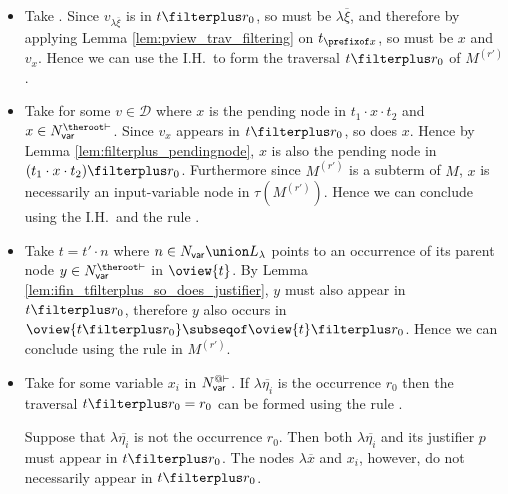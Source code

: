 \begin{itemize}
    \item {} Take .
        Since $v_{\lambda \overline{\xi}}$ is in $t
        \filterplus r_0$, so must be $\lambda \overline{\xi}$, and
        therefore by applying Lemma \ref{lem:pview_trav_filtering}
        on $t_{\prefixof x}$, so must be $x$ and $v_x$. Hence we can
        use the I.H.\ to form the traversal $t
        \filterplus r_0$ of $M^{(r')}$.


   \item {} Take  for some
    $v \in \mathcal{D}$ where $x$ is the pending node in $t_1 \cdot x \cdot t_2$ and $x \in N_{\sf var}^{\theroot\vdash}$.
    Since $v_x$ appears in $t\filterplus r_0$, so does $x$. Hence by Lemma \ref{lem:filterplus_pendingnode}, $x$ is also the pending node in $(t_1 \cdot x \cdot t_2)\filterplus r_0$. Furthermore since $M^{(r')}$ is a subterm of $M$, $x$ is necessarily an input-variable node in $\tau(M^{(r')})$. Hence we can conclude using the I.H.\ and the rule .


    \item {}  Take $t =  t' \cdot n$ where $n \in N_{\sf var}\union L_\lambda$ points to an occurrence of its parent node $y \in N_{\sf var}^{\theroot\vdash}$ in $\oview{t}$.
    By Lemma \ref{lem:ifin_tfilterplus_so_does_justifier}, $y$ must also appear in $t\filterplus r_0$,
    therefore $y$ also occurs in $\oview{t\filterplus r_0} \subseqof \oview{t}\filterplus r_0$.
    Hence we can conclude using the rule  in $M^{(r')}$.


    \item {}
    Take  for some
        variable $x_i$ in $N_{\sf var}^{@\vdash}$.
    If $\lambda \overline{\eta_i}$ is the occurrence $r_0$ then
    the traversal $t\filterplus r_0 = r_0$ can be formed using
    the rule .

    Suppose that $\lambda \overline{\eta_i}$ is not the occurrence $r_0$. Then both $\lambda \overline{\eta_i}$ and its justifier $p$ must appear in $t\filterplus r_0$. The nodes $\lambda
    \overline{x}$ and $x_i$, however, do not necessarily appear in    $t\filterplus r_0$.


\end{itemize}
